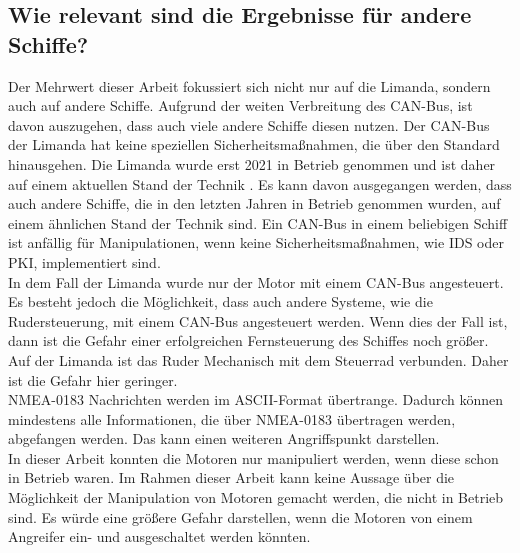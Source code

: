 \subsection{Wie relevant sind die Ergebnisse für andere Schiffe?}
Der Mehrwert dieser Arbeit fokussiert sich nicht nur auf die Limanda, sondern auch auf andere Schiffe.
Aufgrund der weiten Verbreitung des CAN-Bus, ist davon auszugehen, dass auch viele andere Schiffe diesen nutzen.
Der CAN-Bus der Limanda hat keine speziellen Sicherheitsmaßnahmen, die über den Standard hinausgehen. 
Die Limanda wurde erst 2021 in Betrieb genommen und ist daher auf einem aktuellen Stand der Technik \cite{limanda}.
Es kann davon ausgegangen werden, dass auch andere Schiffe, die in den letzten Jahren in Betrieb genommen wurden, auf einem
ähnlichen Stand der Technik sind. Ein CAN-Bus in einem beliebigen Schiff ist anfällig für Manipulationen, wenn keine
Sicherheitsmaßnahmen, wie IDS oder PKI, implementiert sind. \\
In dem Fall der Limanda wurde nur der Motor mit einem CAN-Bus angesteuert. Es besteht jedoch die Möglichkeit, dass auch 
andere Systeme, wie die Rudersteuerung, mit einem CAN-Bus angesteuert werden. Wenn dies der Fall ist, dann 
ist die Gefahr einer erfolgreichen Fernsteuerung des Schiffes noch größer. Auf der Limanda ist das Ruder Mechanisch
mit dem Steuerrad verbunden. Daher ist die Gefahr hier geringer.
\\
NMEA-0183 Nachrichten werden im ASCII-Format übertrange. Dadurch können mindestens 
alle Informationen, die über NMEA-0183 übertragen werden, abgefangen werden. Das kann einen weiteren Angriffspunkt darstellen. \\
In dieser Arbeit konnten die Motoren nur manipuliert werden, wenn diese schon in Betrieb waren. 
Im Rahmen dieser Arbeit kann keine Aussage über 
die Möglichkeit der Manipulation von Motoren gemacht werden, die nicht in Betrieb sind. Es würde eine größere Gefahr
darstellen, wenn die Motoren von einem Angreifer ein- und ausgeschaltet werden könnten. \\

